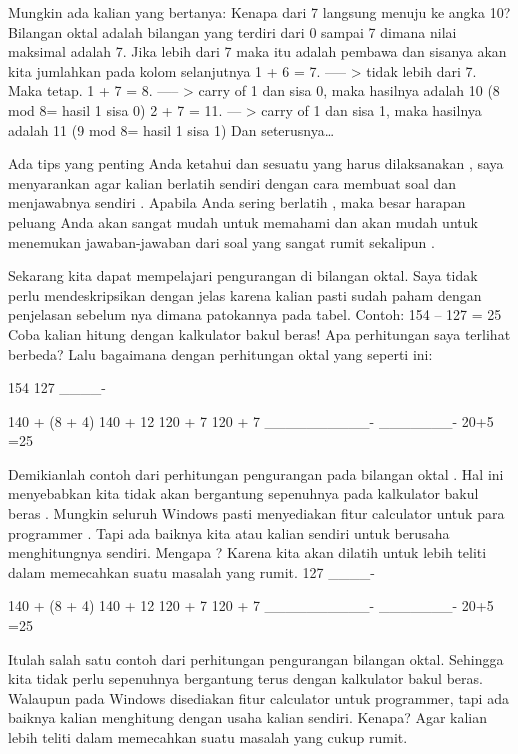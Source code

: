 Mungkin ada kalian yang bertanya: Kenapa dari 7 langsung menuju ke angka 10?
Bilangan oktal adalah bilangan yang terdiri dari 0 sampai 7 dimana nilai maksimal adalah 7. Jika lebih dari 7 maka itu  adalah pembawa dan sisanya akan kita jumlahkan pada kolom selanjutnya
1 + 6 = 7. —– > tidak lebih dari 7. Maka tetap.
1 + 7 = 8. —– > carry of 1 dan sisa 0, maka hasilnya adalah 10 (8 mod 8= hasil 1 sisa 0)
2 + 7 = 11. — > carry of 1 dan sisa 1, maka hasilnya adalah 11 (9 mod 8= hasil 1 sisa 1)
Dan seterusnya…

Ada tips yang penting Anda ketahui dan sesuatu yang harus dilaksanakan , saya menyarankan agar kalian berlatih sendiri dengan cara membuat soal dan menjawabnya sendiri . Apabila Anda sering berlatih , maka besar harapan peluang Anda akan sangat mudah untuk memahami dan akan mudah untuk menemukan jawaban-jawaban dari soal yang sangat rumit sekalipun .

Sekarang kita dapat mempelajari pengurangan di bilangan oktal. Saya tidak perlu mendeskripsikan dengan jelas karena kalian pasti sudah paham dengan penjelasan sebelum nya dimana patokannya pada tabel.
Contoh:
154 – 127 = 25
Coba kalian hitung dengan kalkulator bakul beras! Apa perhitungan saya terlihat berbeda?
Lalu bagaimana dengan perhitungan oktal yang seperti ini:

154
127
____-
 
140 + (8 + 4)                        140 + 12
120 +        7                           120 +   7
__________-                    _______-
                                                20+5
                                                =25

Demikianlah contoh dari perhitungan pengurangan pada bilangan oktal . Hal ini menyebabkan kita tidak akan bergantung sepenuhnya pada kalkulator bakul beras . Mungkin seluruh Windows pasti menyediakan fitur calculator untuk para programmer . Tapi ada baiknya kita atau kalian sendiri untuk berusaha menghitungnya sendiri. Mengapa ? Karena kita akan dilatih untuk lebih teliti dalam memecahkan suatu masalah yang rumit. 
127
____-
 
140 + (8 + 4)                        140 + 12
120 +    7                           120 +   7
__________-                    _______-
                                                20+5
                                                =25

Itulah salah satu contoh dari perhitungan pengurangan bilangan oktal. Sehingga kita tidak perlu sepenuhnya bergantung terus dengan kalkulator bakul beras. Walaupun pada Windows disediakan fitur calculator untuk programmer, tapi ada baiknya kalian menghitung dengan usaha kalian sendiri. Kenapa? Agar kalian lebih teliti dalam memecahkan suatu masalah yang cukup rumit.
 
